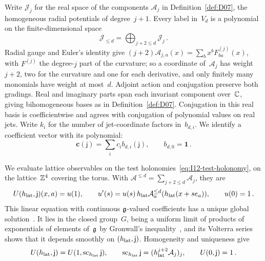 Write $\mathcal J_j$ for the real space of the components $\mathcal A_j$ in Definition~\ref{def:D07}, the homogeneous radial potentials of degree~$j+1$. Every label in~$V_d$ is a polynomial on the finite-dimensional space
\begin{equation*}
\mathcal J_{\le d}=\bigoplus_{j+2\le d}\mathcal J_j\,.
\end{equation*}
Radial gauge and Euler's identity give $(j+2)\mathcal A_{j,a}(x)=\sum_bx^bF^{(j)}_{ba}(x)$, with $F^{(j)}$ the degree-$j$ part of the curvature; so a coordinate of~$\mathcal A_j$ has weight~$j+2$, two for the curvature and one for each derivative, and only finitely many monomials have weight at most~$d$. Adjoint action and conjugation preserve both gradings. Real and imaginary parts span each invariant component over~$\mathbb{C}$, giving bihomogeneous bases as in Definition~\ref{def:D07}. Conjugation in this real basis is coefficientwise and agrees with conjugation of polynomial values on real jets. Write $k_i$ for the number of jet-coordinate factors in~$b_{d,i}$. We identify a coefficient vector with its polynomial:
\begin{equation*}
\mathbf c(\mathsf j)=\sum_i c_i b_{d,i}(\mathsf j),\qquad b_{d,0}=\mathbf1\,.
\end{equation*}

We evaluate lattice observables on the test holonomies~\eqref{eq:I12-test-holonomy}, on the lattice~$\mathbb{Z}^4$ covering the torus. With $\mathcal A^{\le d}=\sum_{j+2\le d}\mathcal A_j$, they are
\begin{equation}\label{eq:A-holonomy}
U(h_{\rm lat},\mathsf j)(x,a)=u(1),\qquad
u'(s)=u(s)\,h_{\rm lat}\mathcal A_a^{\le d}(h_{\rm lat}(x+se_a)),\qquad u(0)=1\,.
\end{equation}
This linear equation with continuous $\mathfrak{g}$-valued coefficients has a unique global solution~\cite[Theorem~3.9]{Teschl2012}. It lies in the closed group~$G$, being a uniform limit of products of exponentials of elements of~$\mathfrak{g}$ by Gronwall's inequality~\cite[Lemma~2.7]{Teschl2012}, and its Volterra series shows that it depends smoothly on $(h_{\rm lat},\mathsf j)$. Homogeneity and uniqueness give
\begin{equation}\label{eq:A-dilation}
U(h_{\rm lat},\mathsf j)=U(1,\operatorname{sc}_{h_{\rm lat}}\mathsf j),\qquad
\operatorname{sc}_{h_{\rm lat}}\mathsf j=(h_{\rm lat}^{j+2}\mathcal A_j)_j,\qquad U(0,\mathsf j)=1\,.
\end{equation}

